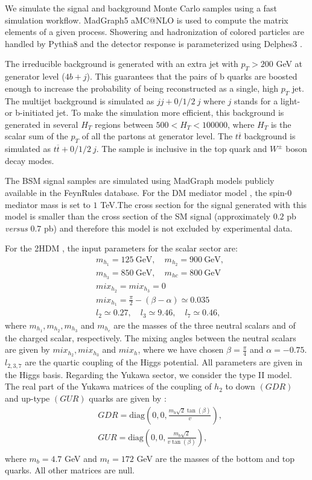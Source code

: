 We simulate the signal and background Monte Carlo samples using a fast simulation workflow. MadGraph5 aMC@NLO \cite{MG5} is used to compute the matrix elements of a given process. Showering and hadronization of colored particles are handled by Pythia8 \cite{Pythia8} and the detector response is parameterized using Delphes3 \cite{Delphes}. 

The irreducible background is generated with an extra jet with $p_T>200$ GeV at generator level ($4b+j$). This guarantees that the pairs of b quarks are boosted enough to increase the probability of being reconstructed as a single, high $p_T$ jet. The multijet background is simulated as $jj+0/1/2~j$ where $j$ stands for a light- or b-initiated jet. To make the simulation more efficient, this background is generated in several $H_T$ regions between $500<H_T<100000$, where $H_T$ is the scalar sum of the $p_T$ of all the partons at generator level. The $t\overline{t}$ background is simulated as $t\overline{t}+0/1/2~j$. The sample is inclusive in the top quark and $W^{\pm}$ boson decay modes.

The BSM signal samples are simulated using MadGraph models publicly available in the FeynRules database. For the DM mediator model \cite{DM}, the spin-$0$ mediator mass is set to $1$ TeV.The cross section for the signal
generated with this model is smaller than the cross section of the SM signal (approximately $0.2$ pb \textit{versus} $0.7$ pb) and therefore this model is not excluded by experimental data.

For the 2HDM \cite{2HDM,2HDM1}, the input parameters for the scalar sector are: 
\begin{align}
&m_{h_1}=125 ~\text{GeV}, \quad m_{h_2}=900 ~\text{GeV},\nonumber \\
&m_{h_3}=850 ~\text{GeV}, \quad m_{hc}=800 ~\text{GeV} \nonumber \\
&mix_{h_2}=mix_{h_3} =0 \nonumber \\
&mix_{h_1}=\frac{\pi}{2}-(\beta-\alpha)\simeq 0.035 \nonumber \\
&l_2\simeq 0.27, \quad l_3\simeq 9.46, \quad l_7\simeq 0.46,
\label{eq:2HDMhiggs_par}
\end{align}
where $m_{h_1}, m_{h_2}, m_{h_3}$ and $m_{h_c}$ are the masses of the three neutral scalars and of the charged scalar, respectively. The mixing angles between the neutral scalars are given by $mix_{h_2}, mix_{h_3}$ and $mix_h$, where we have chosen $\beta=\frac{\pi}{4}$ and $\alpha=-0.75$. $l_{2,3,7}$ are the quartic coupling of the Higgs potential.
All parameters are given in the Higgs basis. Regarding the Yukawa sector, we consider the type II model. The real part of the Yukawa matrices of the coupling of $h_2$ to down $(GDR)$ and up-type $(GUR)$ quarks are given by \cite{2HDM}:
\begin{align}
	&GDR=\text{diag}\left(0,0,\frac{m_b\sqrt{2}\tan(\beta)}{v}\right), \nonumber \\
	&GUR=\text{diag}\left(0,0,\frac{m_b\sqrt{2}}{v\tan(\beta)}\right), \nonumber \\
\end{align}
where $m_b=4.7$ GeV and $m_t=172$ GeV are the masses of the bottom and top quarks. All other matrices are null.  

